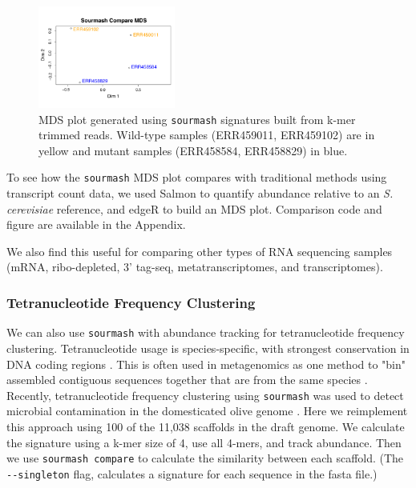 \documentclass[10pt,a4paper,twocolumn]{article}
\begin{document}
\begin{figure}
\centering
\includegraphics[width=0.4\textwidth]{sourmash-mds_f1000_fig1_biggerlabels.pdf}
\caption{\label{fig:sourmash-mds} MDS plot generated using \lstinline{sourmash} signatures built from k-mer trimmed reads. Wild-type samples (ERR459011, ERR459102) are in yellow and mutant samples (ERR458584, ERR458829) in blue. }
\end{figure}

To see how the \lstinline{sourmash} MDS plot compares with traditional methods using transcript count data, we used Salmon \cite{patro2017salmon} to quantify abundance relative to an \textit{S. cerevisiae} reference, and edgeR \cite{robinson2010edger} to build an MDS plot. Comparison code and figure are available in the Appendix.

We also find this useful for comparing other types of RNA sequencing samples (mRNA, ribo-depleted, 3' tag-seq, metatranscriptomes, and transcriptomes). 

\subsubsection*{Tetranucleotide Frequency Clustering}
We can also use \lstinline{sourmash} with abundance tracking for tetranucleotide frequency clustering. Tetranucleotide usage is species-specific, with strongest conservation in DNA coding regions \cite{Pride2003}. This is often used in metagenomics as one method to "bin" assembled contiguous sequences together that are from the same species \cite{Albertsen2013}. Recently, tetranucleotide frequency clustering using \lstinline{sourmash} was used to detect microbial contamination in the domesticated olive genome \cite{Reiter2018}. Here we reimplement this approach using 100 of the 11,038 scaffolds in the draft genome. We calculate the signature using a k-mer size of 4, use all 4-mers, and track abundance. Then we use \lstinline{sourmash compare} to calculate the similarity between each scaffold. (The \lstinline{--singleton} flag, calculates a signature for each sequence in the fasta file.)
\end{document}
